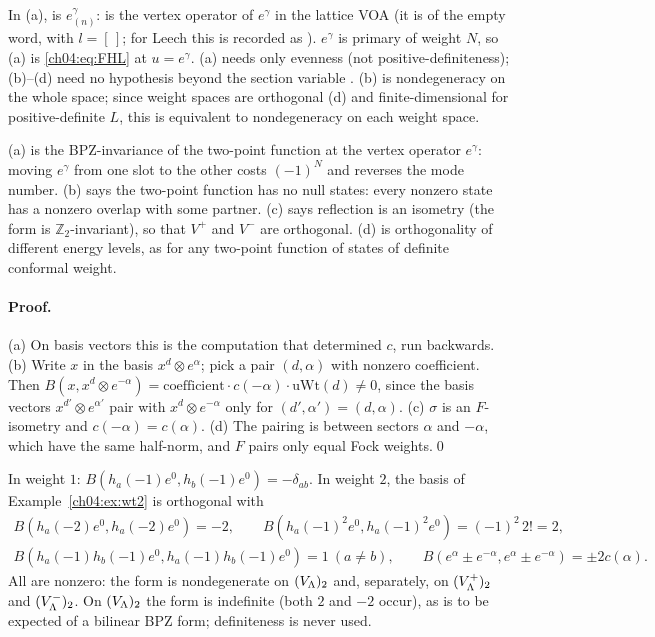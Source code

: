 \begin{dictionary}
In (a),  is $e^\gamma_{(n)}$:  is the vertex operator of
$e^\gamma$ in the lattice VOA (it is  of the empty word,  with
$l=[\,]$; for Leech this is recorded as ). $e^\gamma$ is primary of weight
$N$, so (a) is \eqref{ch04:eq:FHL} at $u=e^\gamma$. (a) needs only evenness (not positive-definiteness);
(b)--(d) need no hypothesis beyond the section variable . (b) is nondegeneracy on the whole
space; since weight spaces are orthogonal (d) and finite-dimensional for positive-definite $L$, this
is equivalent to nondegeneracy on each weight space.
\end{dictionary}

\begin{physics}
(a) is the BPZ-invariance of the two-point function at the vertex operator $e^\gamma$: moving $e^\gamma$ from one slot to the other costs $(-1)^N$ and reverses the mode number. (b) says the two-point function has no null states: every nonzero state has a nonzero overlap with some partner. (c) says reflection is an isometry (the form is $\mathbb Z_2$-invariant), so that $V^+$ and $V^-$ are orthogonal. (d) is orthogonality of different energy levels, as for any two-point function of states of definite conformal weight.
\end{physics}

\paragraph{Proof.} (a) On basis vectors this is the computation that determined $c$, run backwards.
(b) Write $x$ in the basis $x^d\otimes e^\alpha$; pick a pair $(d,\alpha)$ with nonzero coefficient. Then
$B(x,x^d\otimes e^{-\alpha})=\text{coefficient}\cdot c(-\alpha)\cdot\mathrm{uWt}(d)\neq0$, since the basis
vectors $x^{d'}\otimes e^{\alpha'}$ pair with $x^d\otimes e^{-\alpha}$ only for $(d',\alpha')=(d,\alpha)$.
(c) $\sigma$ is an $F$-isometry and $c(-\alpha)=c(\alpha)$. (d) The pairing is between sectors $\alpha$ and
$-\alpha$, which have the same half-norm, and $F$ pairs only equal Fock weights.\qed

\begin{example}
In weight $1$: $B(h_a(-1)e^0,h_b(-1)e^0)=-\delta_{ab}$. In weight $2$, the basis of
Example~\ref{ch04:ex:wt2} is orthogonal with
\begin{gather*}
  B(h_a(-2)e^0,h_a(-2)e^0)=-2,\qquad B(h_a(-1)^2e^0,h_a(-1)^2e^0)=(-1)^2\,2!=2,\\
  B(h_a(-1)h_b(-1)e^0,h_a(-1)h_b(-1)e^0)=1\ (a\neq b),\qquad
  B(e^\alpha\pm e^{-\alpha},e^\alpha\pm e^{-\alpha})=\pm2c(\alpha).
\end{gather*}
All are nonzero: the form is nondegenerate on $(V_{\Lambda})_2$ and, separately, on $(V_{\Lambda}^+)_2$ and
$(V_{\Lambda}^-)_2$. On $(V_{\Lambda})_2$ the form is indefinite (both $2$ and $-2$ occur), as is to be
expected of a bilinear BPZ form; definiteness is never used.
\end{example}

